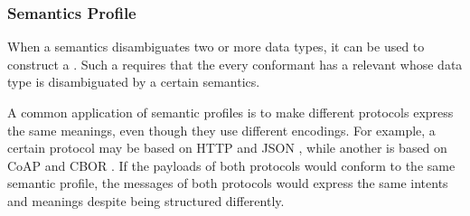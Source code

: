 \subsubsection{Semantics Profile}
\label{sec:concepts:semantics:profile}

When a semantics disambiguates two or more data types, it can be used to construct a .
Such a  requires that the every conformant  has a relevant  whose data type is disambiguated by a certain semantics.

A common application of semantic profiles is to make different protocols express the same meanings, even though they use different encodings.
For example, a certain protocol may be based on HTTP \cite{fielding2014hypertext} and JSON \cite{rfc7159}, while another is based on CoAP \cite{rfc7252} and CBOR \cite{rfc8949}.
If the payloads of both protocols would conform to the same semantic profile, the messages of both protocols would express the same intents and meanings despite being structured differently.
